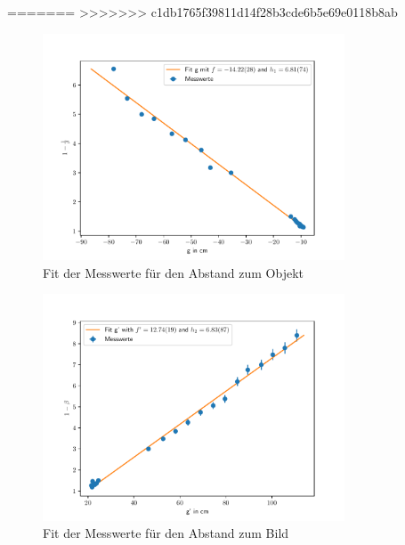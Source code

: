 \documentclass[11pt, a4paper]{article}
\begin{document}
=======
>>>>>>> c1db1765f39811d14f28b3cde6b5e69e0118b8ab
    \begin{figure}[h]
        \centering
        \includegraphics[width=0.8\textwidth]{g.pdf}
        \caption{Fit der Messwerte für den Abstand zum Objekt}
        \label{fig:fit1}
    \end{figure}

    \begin{figure}[h]
        \centering
        \includegraphics[width=0.8\textwidth]{g_prime.pdf}
        \caption{Fit der Messwerte für den Abstand zum Bild}
        \label{fig:fit2}
    \end{figure}

\end{document}
